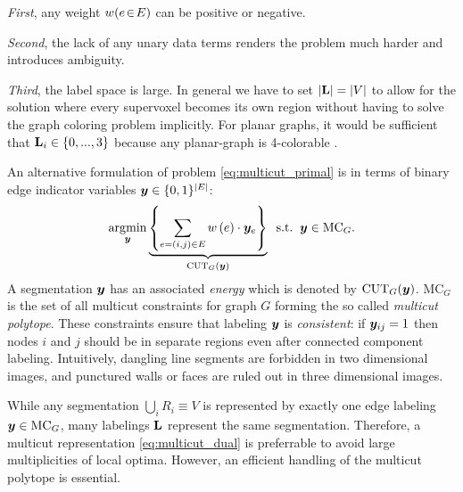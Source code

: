 \noindent
\emph{First}, any weight $w(e\!\in\!E)$ can be positive or negative.

\noindent
\emph{Second}, the lack of any unary data terms renders the problem much harder
and introduces ambiguity.

\noindent
\emph{Third}, the label space is large.
In general we have to set
$|\mathbf{L}| = |V|$ to allow for the solution
where every supervoxel becomes its own region
without having to solve the graph coloring problem implicitly.
For planar graphs, it would be sufficient that $\mathbf{L}_i \in \{0,...,3\}$
because any planar-graph is 4-colorable \cite{appel_1977_4color}.
%


An alternative formulation of problem \eqref{eq:multicut_primal}
is in terms of binary edge indicator variables
$\boldsymbol y \in \{0,1\}^{| E |}$:
\begin{align}
\argmin_{\y}
\underbrace{%
    \left\{
        \sum_{e=(i,j) \in E} \w \left(e\right) \cdot \y_{e}
    \right\}%
}_{%
    \CUT_G(\y)%
}%
\;\;\text{s.t.}\;\;\y \in \MC_G.
\label{eq:multicut_dual}
\end{align}
%
A segmentation $\boldsymbol y$ has an associated \emph{energy}
which is denoted by $\text{CUT}_G(\boldsymbol y)$.
%
$\text{MC}_G$ is the set of all multicut
constraints \cite{chopra_1993_mp} for graph $G$ forming
the so called \emph{multicut polytope}.
These constraints ensure that labeling $\boldsymbol y$ is
\emph{consistent}:
if $\boldsymbol y_{ij}=1$ then nodes $i$ and $j$ should be in
separate regions even after connected component labeling. Intuitively,
dangling line segments are forbidden in two dimensional images,
and punctured walls or faces are ruled out in three dimensional images.

While any segmentation $\bigcup_{i} R_i \equiv V$ is represented by exactly one
edge labeling $\boldsymbol y\in\text{MC}_G$, many labelings $\mathbf{L}$ represent the same segmentation.
Therefore, a multicut representation \eqref{eq:multicut_dual} is preferrable
to avoid large multiplicities of local optima.
%
However, an efficient handling of the multicut polytope is
essential.






